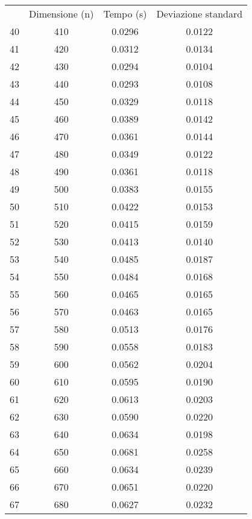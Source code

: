 \begin{table}
\centering
\begin{adjustbox}{width=1\textwidth/2}
\begin{tabular}{|c|c|c|c|}
\hline
 & Dimensione (n) & Tempo (s) & Deviazione standard \\
40 & 410 & 0.0296 & 0.0122 \\
\cline{1-4}
41 & 420 & 0.0312 & 0.0134 \\
\cline{1-4}
42 & 430 & 0.0294 & 0.0104 \\
\cline{1-4}
43 & 440 & 0.0293 & 0.0108 \\
\cline{1-4}
44 & 450 & 0.0329 & 0.0118 \\
\cline{1-4}
45 & 460 & 0.0389 & 0.0142 \\
\cline{1-4}
46 & 470 & 0.0361 & 0.0144 \\
\cline{1-4}
47 & 480 & 0.0349 & 0.0122 \\
\cline{1-4}
48 & 490 & 0.0361 & 0.0118 \\
\cline{1-4}
49 & 500 & 0.0383 & 0.0155 \\
\cline{1-4}
50 & 510 & 0.0422 & 0.0153 \\
\cline{1-4}
51 & 520 & 0.0415 & 0.0159 \\
\cline{1-4}
52 & 530 & 0.0413 & 0.0140 \\
\cline{1-4}
53 & 540 & 0.0485 & 0.0187 \\
\cline{1-4}
54 & 550 & 0.0484 & 0.0168 \\
\cline{1-4}
55 & 560 & 0.0465 & 0.0165 \\
\cline{1-4}
56 & 570 & 0.0463 & 0.0165 \\
\cline{1-4}
57 & 580 & 0.0513 & 0.0176 \\
\cline{1-4}
58 & 590 & 0.0558 & 0.0183 \\
\cline{1-4}
59 & 600 & 0.0562 & 0.0204 \\
\cline{1-4}
60 & 610 & 0.0595 & 0.0190 \\
\cline{1-4}
61 & 620 & 0.0613 & 0.0203 \\
\cline{1-4}
62 & 630 & 0.0590 & 0.0220 \\
\cline{1-4}
63 & 640 & 0.0634 & 0.0198 \\
\cline{1-4}
64 & 650 & 0.0681 & 0.0258 \\
\cline{1-4}
65 & 660 & 0.0634 & 0.0239 \\
\cline{1-4}
66 & 670 & 0.0651 & 0.0220 \\
\cline{1-4}
67 & 680 & 0.0627 & 0.0232 \\
\cline{1-4}

\end{tabular}
\end{adjustbox}
\end{table}

